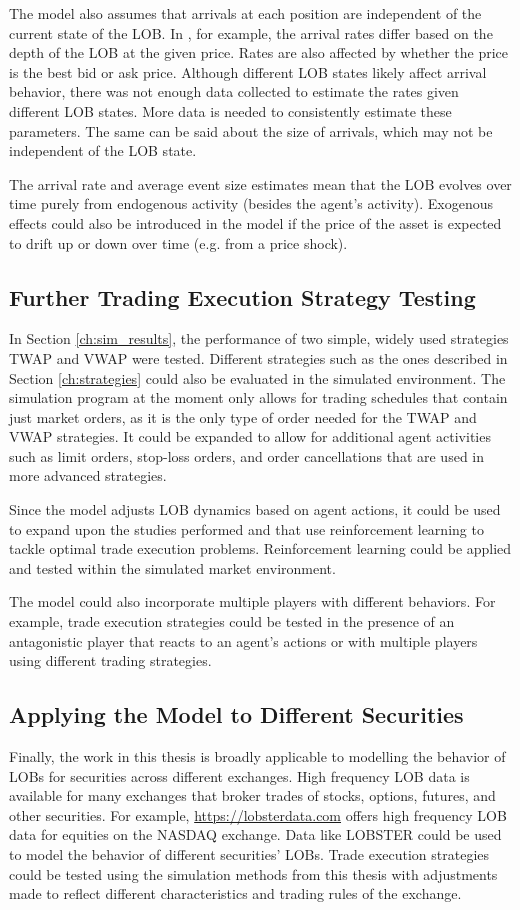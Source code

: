 The model also assumes that arrivals at each position are independent of the current state of the LOB. In \cite{A6}, for example, the arrival rates differ based on the depth of the LOB at the given price. Rates are also affected by whether the price is the best bid or ask price. Although different LOB states likely affect arrival behavior, there was not enough data collected to estimate the rates given different LOB states. More data is needed to consistently estimate these parameters. The same can be said about the size of arrivals, which may not be independent of the LOB state.

The arrival rate and average event size estimates mean that the LOB evolves over time purely from endogenous activity (besides the agent's activity). Exogenous effects could also be introduced in the model if the price of the asset is expected to drift up or down over time (e.g. from a price shock). 

\subsection{Further Trading Execution Strategy Testing}
In Section \ref{ch:sim_results}, the performance of two simple, widely used strategies TWAP and VWAP were tested. Different strategies such as the ones described in Section \ref{ch:strategies} could also be evaluated in the simulated environment. The simulation program at the moment only allows for trading schedules that contain just market orders, as it is the only type of order needed for the TWAP and VWAP strategies. It could be expanded to allow for additional agent activities such as limit orders, stop-loss orders, and order cancellations that are used in more advanced strategies. 

Since the model adjusts LOB dynamics based on agent actions, it could be used to expand upon the studies performed \cite{A3} and \cite{A4} that use reinforcement learning to tackle optimal trade execution problems. Reinforcement learning could be applied and tested within the simulated market environment. 

The model could also incorporate multiple players with different behaviors. For example, trade execution strategies could be tested in the presence of an antagonistic player that reacts to an agent's actions or with multiple players using different trading strategies.

\subsection{Applying the Model to Different Securities}
Finally, the work in this thesis is broadly applicable to modelling the behavior of LOBs for securities across different exchanges. High frequency LOB data is available for many exchanges that broker trades of stocks, options, futures, and other securities. For example, \url{https://lobsterdata.com} offers high frequency LOB data for equities on the NASDAQ exchange. Data like LOBSTER could be used to model the behavior of different securities' LOBs. Trade execution strategies could be tested using the simulation methods from this thesis with adjustments made to reflect different characteristics and trading rules of the exchange.